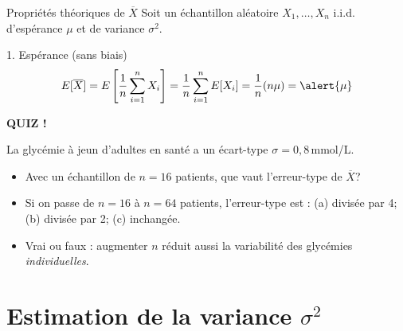 \documentclass{BeamerTemplate}
\begin{document}
\begin{frame}[t]{Propriétés théoriques de $\overline{X}$}
  Soit un échantillon aléatoire $X_1, \ldots, X_n$ i.i.d. d'espérance $\mu$ et de variance $\sigma^2$.

  \medskip
  \begin{Boite}{1. Espérance (sans biais)}
    $$E[\overline{X}] = E\left[\frac{1}{n}\sum_{i=1}^n X_i\right] = \frac{1}{n}\sum_{i=1}^n E[X_i] = \frac{1}{n}(n\mu) = \alert{\mu}$$
  \end{Boite}

  \medskip
\end{frame}

\begin{frame}[plain,t]
  \centerline{\LARGE\bfseries\alert{QUIZ !}}

  \medskip
  La glycémie à jeun d'adultes en santé a un écart-type $\sigma = 0{,}8$\,mmol/L.
  \begin{itemize}\itemsep 6mm
    \item Avec un échantillon de $n = 16$ patients, que vaut l'erreur-type de $\overline{X}$?\\
    \item Si on passe de $n = 16$ à $n = 64$ patients, l'erreur-type est : (a) divisée par 4; (b) divisée par 2; (c) inchangée.\\
    \item Vrai ou faux : augmenter $n$ réduit aussi la variabilité des glycémies \emph{individuelles}.\\
  \end{itemize}
\end{frame}

\section{Estimation de la variance \texorpdfstring{$\sigma^2$}{sigma2}}
\end{document}

